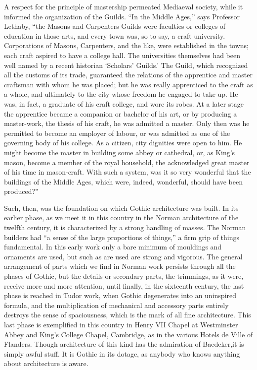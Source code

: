 \documentclass{book}
\begin{document}
A respect for the principle of mastership permeated Mediaeval society, while it informed the organization of the Guilds. “In the Middle Ages,” says Professor Lethaby, “the Masons and Carpenters Guilds were faculties or colleges of education in those arts, and every town was, so to say, a craft university. Corporations of Masons, Carpenters, and the like, were established in the towns; each craft aspired to have a college hall. The universities themselves had been well named by a recent historian ‘Scholars’ Guilds.’ The Guild, which recognized all the customs of its trade, guaranteed the relations of the apprentice and master craftsman with whom he was placed; but he was really apprenticed to the craft as a whole, and ultimately to the city whose freedom he engaged to take up. He was, in fact, a graduate of his craft college, and wore its robes. At a later stage the apprentice became a companion or bachelor of his art, or by producing a master-work, the thesis of his craft, he was admitted a master. Only then was he permitted to become an employer of labour, or was admitted as one of the governing body of his college. As a citizen, city dignities were open to him. He might become the master in building some abbey or cathedral, or, as King’s mason, become a member of the royal household, the acknowledged great master of his time in mason-craft. With such a system, was it so very wonderful that the buildings of the Middle Ages, which were, indeed, wonderful, should have been produced?”\footnotemark[3]

Such, then, was the foundation on which Gothic architecture was built. In its earlier phase, as we meet it in this country in the Norman architecture of the twelfth century, it is characterized by a strong handling of masses. The Norman builders had “a sense of the large proportions of things,” a firm grip of things fundamental. In this early work only a bare minimum of mouldings and ornaments are used, but such as are used are strong and vigorous. The general arrangement of parts which we find in Norman work persists through all the phases of Gothic, but the details or secondary parts, the trimmings, as it were, receive more and more attention, until finally, in the sixteenth century, the last phase is reached in Tudor work, when Gothic degenerates into an uninspired formula, and the multiplication of mechanical and accessory parts entirely destroys the sense of spaciousness, which is the mark of all fine architecture. This last phase is exemplified in this country in Henry VII Chapel at Westminster Abbey and King’s College Chapel, Cambridge, as in the various Hotels de Ville of Flanders. Though architecture of this kind has the admiration of Baedeker,\footnotemark[4] it is simply awful stuff. It is Gothic in its dotage, as anybody who knows anything about architecture is aware.
\end{document}
